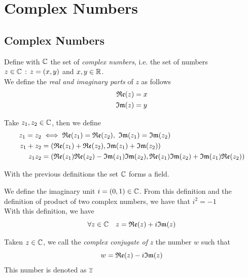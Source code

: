 \documentclass[../complete.tex]{subfiles}
\begin{document}
\chapter{Complex Numbers}
\section{Complex Numbers}
\begin{dfn}
	Define with $\Cf$ the set of \textit{complex numbers}, i.e. the set of numbers $z\in\mathbb{C}\, :\,  z=(x,y)$ and $x,y\in\mathbb{R}$.\\
	We define the \textit{real and imaginary parts} of $z$ as follows
	\begin{equation}
		\begin{aligned}
			\mathfrak{Re}{(z)}&=x\\
			\mathfrak{Im}{(z)}&=y
		\end{aligned}
		\label{eq:realimaginarypart}
	\end{equation}
\end{dfn}
\begin{dfn}[Operations in $\Cf$]
	Take $z_1,z_2\in\mathbb{C}$, then we define
	\begin{equation*}
		\begin{aligned}
			z_1=z_2&\iff \real{(z_1)}=\real{(z_2)},\ \imaginary{(z_1)}=\imaginary{(z_2)}\\
			z_1+z_2&=(\real{(z_1)}+\real{(z_2)},\imaginary{(z_1)}+\imaginary{(z_2)})\\
			z_1z_2&=(\real{(z_1)}\real{(z_2)}-\imaginary{(z_1)}\imaginary{(z_2)},\real{(z_1)}\imaginary{(z_2)}+\imaginary{(z_1)}\real{(z_2)})
		\end{aligned}
	\end{equation*}
\end{dfn}
\begin{thm}
	With the previous definitions the set $\Cf$ forms a field.
\end{thm}
\begin{dfn}
	We define the imaginary unit $i=(0,1)\in\mathbb{C}$. From this definition and the definition of product of two complex numbers, we have that $i^2=-1$\\
	With this definition, we have
	\begin{equation}
		\forall z\in\mathbb{C}\quad z=\mathfrak{Re}{(z)}+i\mathfrak{Im}{(z)}
		\label{eq:complex}
	\end{equation}
\end{dfn}
\begin{dfn}
	Taken $z\in\mathbb{C}$, we call the \textit{complex conjugate of} $z$ the number $w$ such that
	\begin{equation}
		w=\mathfrak{Re}{(z)}-i\mathfrak{Im}{(z)}
		\label{eq:complexcon}
	\end{equation}
	This number is denoted as $\overline{z}$
\end{dfn}
\end{document}
